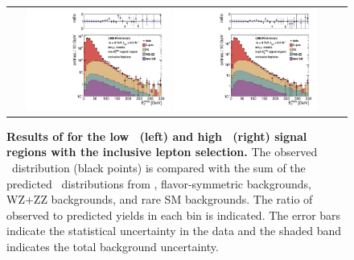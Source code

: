 \begin{figure}[!h]
\begin{center}
\begin{tabular}{cc}
\includegraphics[width=0.45\textwidth]{plots/edge_pfmet_pt40_lowMet_all.pdf}
\includegraphics[width=0.45\textwidth]{plots/edge_pfmet_pt40_highMet_all.pdf}
\end{tabular}
\caption{\footnotesize {\bf Results of for the low \MET\ (left) and high \MET\ (right) signal regions with the inclusive lepton selection.}
The observed \MET\ distribution (black points) is compared with the sum of the predicted \MET\
distributions from \zjets, flavor-symmetric backgrounds, WZ+ZZ backgrounds, and rare SM backgrounds. 
The ratio of observed to predicted yields in each bin is
indicated. The error bars indicate the statistical uncertainty in the data and the shaded band indicates the total background uncertainty.
\label{fig:results_inclusive}
}
\end{center}
\end{figure}

